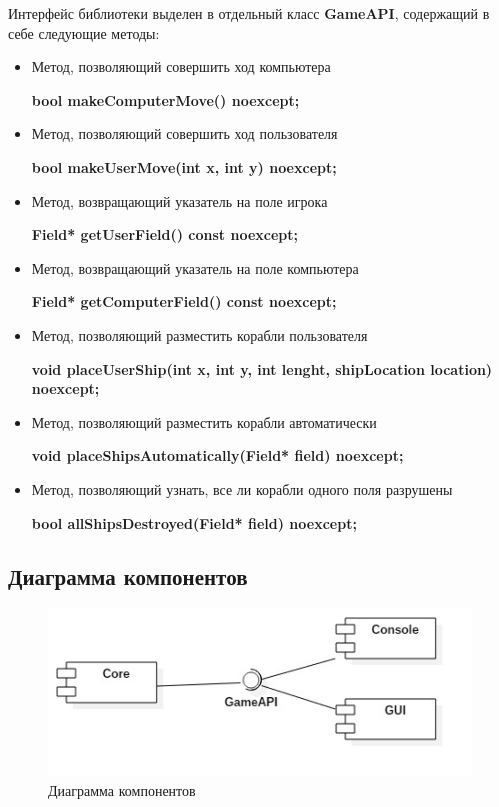 \documentclass[a4paper]{article}
\begin{document}
Интерфейс библиотеки выделен в отдельный класс \textbf{GameAPI}, содержащий в себе следующие методы:

\begin{itemize}

\item Метод, позволяющий совершить ход компьютера

\textbf{bool makeComputerMove() noexcept;}

\item Метод, позволяющий совершить ход пользователя

\textbf{bool makeUserMove(int x, int y) noexcept;}

\item Метод, возвращающий указатель на поле игрока

\textbf{Field* getUserField() const noexcept;}

\item Метод, возвращающий указатель на поле компьютера

\textbf{Field* getComputerField() const noexcept;}

\item Метод, позволяющий разместить корабли пользователя

\textbf{void placeUserShip(int x, int y, int lenght, shipLocation location) noexcept;}

\item Метод, позволяющий разместить корабли автоматически

\textbf{void placeShipsAutomatically(Field* field) noexcept;}

\item Метод, позволяющий узнать, все ли корабли одного поля разрушены

\textbf{bool allShipsDestroyed(Field* field) noexcept;}

\end{itemize}

\subsection{Диаграмма компонентов}

\begin{figure}[H]
	\begin{center}
		\includegraphics[scale=0.7]{Diagrams/ComponentDiagram.jpg}
		\caption{Диаграмма компонентов} 
		\label{pic:pic_name} %
	\end{center}
\end{figure}
\end{document}
